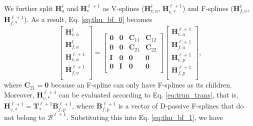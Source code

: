 \documentclass[graybox]{svmult}
\begin{document}
We further split $\bm{H}_a^\ell$ and $\bm{H}_*^{\ell+1}$ as V-splines ($\bm{H}_{v,a}^\ell$, $\bm{H}_{v,*}^{\ell+1}$) and F-splines ($\bm{H}_{f\!,a}^\ell$, $\bm{H}_{f\!,*}^{\ell+1}$). As a result, Eq. \eqref{eq:thu_bf_0} becomes
\begin{equation}
\begin{bmatrix}
\bm{H}_{v,a}^\ell \\ \bm{H}_{f\!,a}^\ell \\ \bm{H}_{v,a}^{\ell+1} \\ \bm{H}_{f\!,a}^{\ell+1} \\
\end{bmatrix}=
\begin{bmatrix}
\bm{0} & \bm{0} & \bm{C}_{11} & \bm{C}_{12} \\
\bm{0} & \bm{0} & \bm{C}_{21} & \bm{C}_{22} \\
\bm{I} & \bm{0} & \bm{0} & \bm{0} \\
\bm{0} & \bm{I} & \bm{0} & \bm{0} \\
\end{bmatrix}
\begin{bmatrix}
\bm{H}_{v,a}^{\ell+1} \\ \bm{H}_{f\!,a}^{\ell+1}  \\ \bm{H}_{v,p}^{\ell+1} \\ \bm{H}_{f\!,p}^{\ell+1} \\
\end{bmatrix},
\label{eq:thu_bf_1}
\end{equation}
where $\bm{C}_{21}=\bm{0}$ because an F-spline can only have F-splines as its children.
Moreover, $\bm{H}_{v,*}^{\ell+1}$ can be evaluated according to Eq. \eqref{eq:trun_trans}, that is, $\bm{H}_{v,*}^{\ell+1}=\bm{T}_{*}^{\ell+1} \bm{B}_{f\!,p}^{\ell+1}$, where $\bm{B}_{f\!,p}^{\ell+1}$ is a vector of D-passive F-splines that do not belong to $\mathcal{B}^{\ell+1}$. Substituting this into Eq. \eqref{eq:thu_bf_1}, we have
\end{document}
